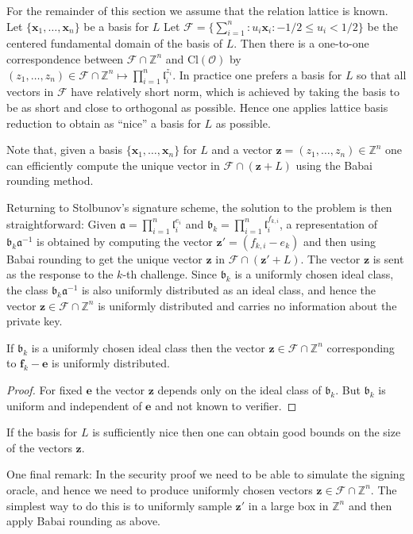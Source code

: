 \documentclass{llncs}
\newcommand{\FF}{\mathcal{F}}
\newcommand{\OO}{\mathcal{O}}
\newcommand{\Z}{\mathbb{Z}}
\newcommand{\Cl}{\text{Cl}}
\renewcommand{\a}{\mathfrak{a}}
\renewcommand{\b}{\mathfrak{b}}
\renewcommand{\l}{\mathfrak{l}}
\newcommand{\e}{\textbf{e}}
\newcommand{\f}{\textbf{f}}
\newcommand{\x}{\textbf{x}}
\newcommand{\z}{\textbf{z}}
\begin{document}
For the remainder of this section we assume that the relation lattice is known.
Let $\{ \x_1, \dots, \x_n \}$ be a basis for $L$
Let $\FF = \{ \sum_{i=1}^n : u_i \x_i : -1/2 \le u_i < 1/2 \}$ be the centered fundamental domain of the basis of $L$.
Then there is a one-to-one correspondence between $\FF \cap \Z^n$ and $\Cl(\OO)$ by
$(z_1, \dots, z_n ) \in \FF \cap \Z^n  \mapsto \prod_{i=1}^n \l_i^{z_i}$.
In practice one prefers a basis for $L$ so that all vectors in $\FF$ have relatively short norm, which is achieved by taking the basis to be as short and close to orthogonal as possible. Hence one applies lattice basis reduction to obtain as ``nice'' a basis for $L$ as possible.

Note that, given a basis $\{ \x_1, \dots, \x_n \}$ for $L$ and a vector $\z = (z_1, \dots, z_n ) \in \Z^n$ one can efficiently compute the unique vector in $\FF \cap (\z + L )$ using the Babai rounding method.



Returning to Stolbunov's signature scheme, the solution to the problem is then straightforward:
Given $\a = \prod_{i=1}^n \l_i^{e_i}$ and $\b_k = \prod_{i=1}^n \l_i^{f_{k,i}}$,
a representation of $\b_k \a^{-1}$ is obtained by computing the vector $\z' = (f_{k,i} - e_k)$
and then using Babai rounding to get the unique vector $\z$ in $\FF \cap (\z' + L )$.
The vector $\z$ is sent as the response to the $k$-th challenge.
Since $\b_k$ is a uniformly chosen ideal class, the class $\b_k \a^{-1}$ is also uniformly distributed as an ideal class, and hence the vector $\z \in \FF \cap \Z^n$ is uniformly distributed and carries no information about the private key.

\begin{lemma}
If $\b_k$ is a uniformly chosen ideal class then the vector 
$\z \in \FF \cap \Z^n$ corresponding to $\f_k - \e$ is uniformly distributed.
\end{lemma}

\begin{proof}
For fixed $\e$ the vector $\z$ depends only on the ideal class of $\b_k$.
But $\b_k$ is uniform and independent of $\e$ and not known to verifier.
\end{proof}



If the basis for $L$ is sufficiently nice then one can obtain good bounds on the size of the vectors $\z$.

One final remark: In the security proof we need to be able to simulate the signing oracle, and hence we need to produce uniformly chosen vectors $\z \in \FF \cap \Z^n$.
The simplest way to do this is to uniformly sample $\z'$ in a large box in $\Z^n$ and then apply Babai rounding as above.
\end{document}
